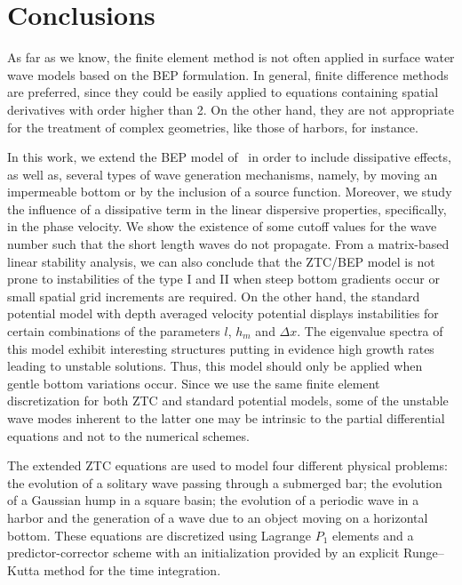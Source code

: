 \section{Conclusions}

As far as we know, the finite element method is not often applied in
surface water wave models based on the BEP formulation.  In general,
finite difference methods are preferred, since they could be easily
applied to equations containing spatial derivatives with order higher
than 2.  On the other hand, they are not appropriate for the treatment
of complex geometries, like those of harbors, for instance.

In this work, we extend the BEP model of~\citet{ZhaoTengCheng2004} in
order to include dissipative effects, as well as, several types of
wave generation mechanisms, namely, by moving an impermeable bottom or
by the inclusion of a source function.  Moreover, we study the
influence of a dissipative term in the linear dispersive properties,
specifically, in the phase velocity.  We show the existence of some
cutoff values for the wave number such that the short length waves do
not propagate.  From a matrix-based linear stability analysis, we can
also conclude that the ZTC/BEP model is not prone to instabilities of
the type I and II when steep bottom gradients occur or small spatial
grid increments are required.  On the other hand, the standard
potential model with depth averaged velocity potential displays
instabilities for certain combinations of the parameters $l$, $h_m$
and $\Delta x$. The eigenvalue spectra of this model exhibit
interesting structures putting in evidence high growth rates leading
to unstable solutions. Thus, this model should only be applied when
gentle bottom variations occur.  Since we use the same finite element
discretization for both ZTC and standard potential models, some of the
unstable wave modes inherent to the latter one may be intrinsic to the
partial differential equations and not to the numerical schemes.

The extended ZTC equations are used to model four different physical
problems: the evolution of a solitary wave passing through a submerged
bar; the evolution of a Gaussian hump in a square basin; the evolution
of a periodic wave in a harbor and the generation of a wave due to an
object moving on a horizontal bottom.  These equations are discretized
using Lagrange $P_1$ elements and a predictor-corrector scheme with an
initialization provided by an explicit Runge--Kutta method for the
time integration.

